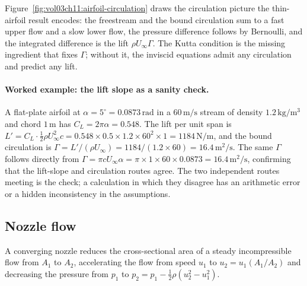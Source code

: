 

Figure~\ref{fig:vol03ch11:airfoil-circulation} draws the
circulation picture the thin-airfoil result encodes: the freestream
and the bound circulation sum to a fast upper flow and a slow lower
flow, the pressure difference follows by Bernoulli, and the integrated
difference is the lift $\rho U_\infty\Gamma$. The Kutta condition is
the missing ingredient that fixes $\Gamma$; without it, the inviscid
equations admit any circulation and predict any lift.

\paragraph{Worked example: the lift slope as a sanity check.} A
flat-plate airfoil at $\alpha = 5^\circ = 0.0873\,\text{rad}$ in a
$60\,\si{\meter\per\second}$ stream of density
$1.2\,\si{\kilogram\per\meter\cubed}$ and chord $1\,\si{\meter}$ has
$C_L = 2\pi\alpha = 0.548$. The lift per unit span is $L' = C_L\cdot
\tfrac12\rho U_\infty^2 c = 0.548\times 0.5\times 1.2\times 60^2\times
1 = 1184\,\si{\newton\per\meter}$, and the bound circulation is
$\Gamma = L'/(\rho U_\infty) = 1184/(1.2\times 60) =
16.4\,\si{\meter\squared\per\second}$. The same $\Gamma$ follows
directly from $\Gamma = \pi c U_\infty\alpha = \pi\times 1\times
60\times 0.0873 = 16.4\,\si{\meter\squared\per\second}$, confirming
that the lift-slope and circulation routes agree. The two independent
routes meeting is the check; a calculation in which they disagree has
an arithmetic error or a hidden inconsistency in the assumptions.

\subsection{Nozzle flow}

A converging nozzle reduces the cross-sectional area of a steady
incompressible flow from $A_1$ to $A_2$, accelerating the flow from
speed $u_1$ to $u_2 = u_1(A_1/A_2)$ and decreasing the pressure
from $p_1$ to $p_2 = p_1 - \tfrac{1}{2}\rho(u_2^2 - u_1^2)$.

